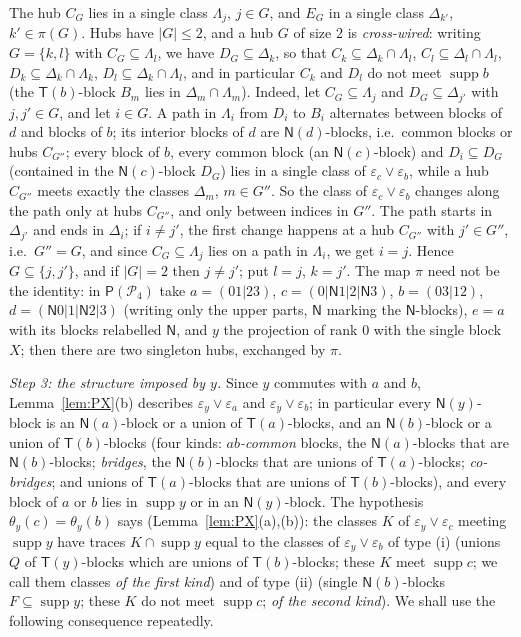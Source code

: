\documentclass[11pt]{amsart}
\theoremstyle{definition}
\renewcommand{\P}{\mathcal{P}}      %
\newcommand{\PA}{\mathsf{P}}         %
\newcommand{\supp}{\operatorname{supp}}
\newcommand{\T}{\mathsf{T}}
\newcommand{\N}{\mathsf{N}}
\begin{document}
The hub $C_G$ lies in a single class $\Lambda_j$, $j\in G$, and $E_G$ in a single class $\Delta_{k'}$, $k'\in\pi(G)$. Hubs have $|G|\le2$, and a hub $G$ of size $2$ is \emph{cross-wired}: writing $G=\{k,l\}$ with $C_G\subseteq\Lambda_l$, we have $D_G\subseteq\Delta_k$, so that $C_k\subseteq\Delta_k\cap\Lambda_l$, $C_l\subseteq\Delta_l\cap\Lambda_l$, $D_k\subseteq\Delta_k\cap\Lambda_k$, $D_l\subseteq\Delta_k\cap\Lambda_l$, and in particular $C_k$ and $D_l$ do not meet $\supp b$ (the $\T(b)$-block $B_m$ lies in $\Delta_m\cap\Lambda_m$). Indeed, let $C_G\subseteq\Lambda_j$ and $D_G\subseteq\Delta_{j'}$ with $j,j'\in G$, and let $i\in G$. A path in $\Lambda_i$ from $D_i$ to $B_i$ alternates between blocks of $d$ and blocks of $b$; its interior blocks of $d$ are $\N(d)$-blocks, i.e.\ common blocks or hubs $C_{G''}$; every block of $b$, every common block (an $\N(c)$-block) and $D_i\subseteq D_G$ (contained in the $\N(c)$-block $D_G$) lies in a single class of $\varepsilon_c\vee\varepsilon_b$, while a hub $C_{G''}$ meets exactly the classes $\Delta_m$, $m\in G''$. So the class of $\varepsilon_c\vee\varepsilon_b$ changes along the path only at hubs $C_{G''}$, and only between indices in $G''$. The path starts in $\Delta_{j'}$ and ends in $\Delta_i$; if $i\ne j'$, the first change happens at a hub $C_{G''}$ with $j'\in G''$, i.e.\ $G''=G$, and since $C_G\subseteq\Lambda_j$ lies on a path in $\Lambda_i$, we get $i=j$. Hence $G\subseteq\{j,j'\}$, and if $|G|=2$ then $j\ne j'$; put $l=j$, $k=j'$. The map $\pi$ need not be the identity: in $\PA(\P_4)$ take $a=(01|23)$, $c=(0|\N1|2|\N3)$, $b=(03|12)$, $d=(\N0|1|\N2|3)$ (writing only the upper parts, $\N$ marking the $\N$-blocks), $e=a$ with its blocks relabelled $\N$, and $y$ the projection of rank $0$ with the single block $X$; then there are two singleton hubs, exchanged by $\pi$.

\smallskip
\emph{Step 3: the structure imposed by $y$.} Since $y$ commutes with $a$ and $b$, Lemma~\ref{lem:PX}(b) describes $\varepsilon_y\vee\varepsilon_a$ and $\varepsilon_y\vee\varepsilon_b$; in particular every $\N(y)$-block is an $\N(a)$-block or a union of $\T(a)$-blocks, and an $\N(b)$-block or a union of $\T(b)$-blocks (four kinds: \emph{$ab$-common} blocks, the $\N(a)$-blocks that are $\N(b)$-blocks; \emph{bridges}, the $\N(b)$-blocks that are unions of $\T(a)$-blocks; \emph{co-bridges}; and unions of $\T(a)$-blocks that are unions of $\T(b)$-blocks), and every block of $a$ or $b$ lies in $\supp y$ or in an $\N(y)$-block. The hypothesis $\theta_y(c)=\theta_y(b)$ says (Lemma~\ref{lem:PX}(a),(b)): the classes $K$ of $\varepsilon_y\vee\varepsilon_c$ meeting $\supp y$ have traces $K\cap\supp y$ equal to the classes of $\varepsilon_y\vee\varepsilon_b$ of type (i) (unions $Q$ of $\T(y)$-blocks which are unions of $\T(b)$-blocks; these $K$ meet $\supp c$; we call them classes \emph{of the first kind}) and of type (ii) (single $\N(b)$-blocks $F\subseteq\supp y$; these $K$ do not meet $\supp c$; \emph{of the second kind}). We shall use the following consequence repeatedly.
\end{document}
